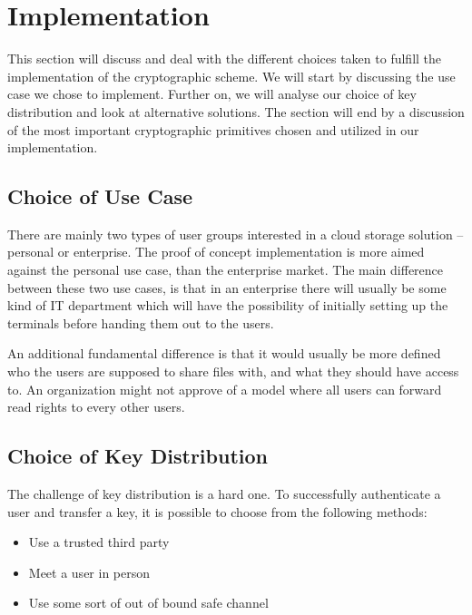 \documentclass[pdftex,english,10pt,b5paper,twoside]{book}
\begin{document}
\section{Implementation}
\label{sec:DIS:impl}

This section will discuss and deal with the different choices taken to fulfill
the implementation of the cryptographic scheme. We will start by discussing the
use case we chose to implement. Further on, we will analyse our choice of key
distribution and look at alternative solutions. The section will end by a
discussion of the most important cryptographic primitives chosen and utilized
in our implementation.

\subsection{Choice of Use Case}

There are mainly two types of user groups interested in a cloud storage
solution -- personal or enterprise. The proof of concept implementation is more
aimed against the personal use case, than the enterprise market. The main
difference between these two use cases, is that in an enterprise there will
usually be some kind of IT department which will have the possibility of
initially setting up the terminals before handing them out to the users.

An additional fundamental difference is that it would usually be more defined
who the users are supposed to share files with, and what they should have
access to. An organization might not approve of a model where all users can
forward read rights to every other users.

\subsection{Choice of Key Distribution}
\label{sec:DI:keydist}

The challenge of key distribution is a hard one. To successfully authenticate a
user and transfer a key, it is possible to choose from the following methods:

\begin{itemize}
 \item Use a trusted third party
 \item Meet a user in person
 \item Use some sort of out of bound safe channel
\end{itemize}
\end{document}
